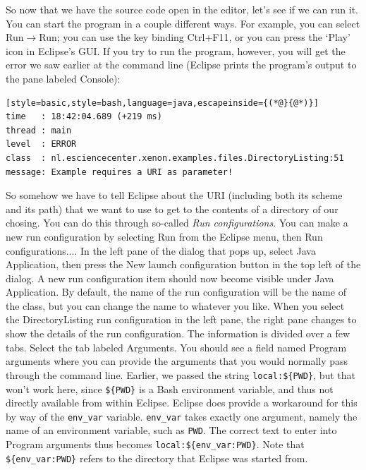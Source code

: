 \documentclass[12pt, a4paper, twoside, openany, titlepage]{book}
\begin{document}
So now that we have the source code open in the editor, let's see if we can run it. You can start the program in a couple different ways. For example, you can select \textsf{Run}$\rightarrow$\textsf{Run}; you can use the key binding \textsf{Ctrl+F11}, or you can press the `Play' icon in Eclipse's GUI. If you try to run the program, however, you will get the error we saw earlier at the command line (Eclipse prints the program's output to the pane labeled \textsf{Console}):
\begin{lstlisting}[style=basic,style=bash,language=java,escapeinside={(*@}{@*)}]
time   : 18:42:04.689 (+219 ms)
thread : main
level  : ERROR
class  : nl.esciencecenter.xenon.examples.files.DirectoryListing:51
message: Example requires a URI as parameter!
\end{lstlisting}

So somehow we have to tell Eclipse about the URI (including both its scheme and its path) that we want to use to get to the contents of a directory of our chosing. You can do this through so-called \textit{Run configurations}. You can make a new run configuration by selecting \textsf{Run} from the Eclipse menu, then \textsf{Run configurations...}. In the left pane of the dialog that pops up, select \textsf{Java Application}, then press the \textsf{New launch configuration} button in the top left of the dialog. A new run configuration item should now become visible under \textsf{Java Application}. By default, the name of the run configuration will be the name of the class, but you can change the name to whatever you like. When you select the \textsf{DirectoryListing} run configuration in the left pane, the right pane changes to show the details of the run configuration. The information is divided over a few tabs. Select the tab labeled \textsf{Arguments}. You should see a field named \textsf{Program arguments} where you can provide the arguments that you would normally pass through the command line. Earlier, we passed the string \texttt{local:\$\{PWD\}}, but that won't work here, since \texttt{\$\{PWD\}} is a Bash environment variable, and thus not directly available from within Eclipse. Eclipse does provide a workaround for this by way of the \texttt{env\_var} variable. \texttt{env\_var} takes exactly one argument, namely the name of an environment variable, such as \texttt{PWD}. The correct text to enter into \textsf{Program arguments} thus becomes \texttt{local:\$\{env\_var:PWD\}}. Note that \texttt{\$\{env\_var:PWD\}} refers to the directory that Eclipse was started from.
\end{document}
